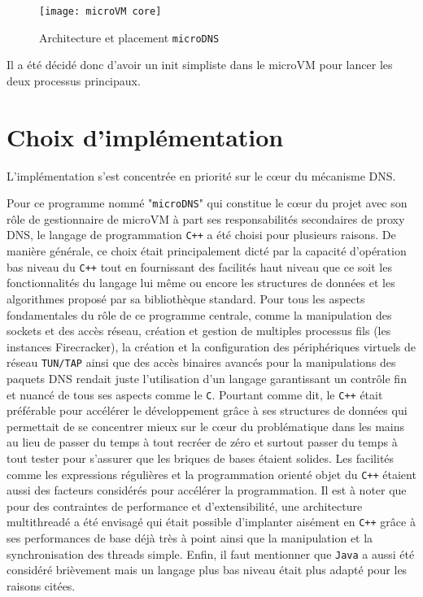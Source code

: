 \documentclass[12pt]{article}
\begin{document}
\begin{figure}[H]
	\centering
	\texttt{[image: microVM core]}
	\caption{Architecture et placement \texttt{microDNS}}
	\label{microVM:corearch}
\end{figure}

Il a été décidé donc d'avoir un init simpliste dans le microVM pour lancer les deux processus principaux.

\section{Choix d'implémentation}
\label{header:choiximpem}
L'implémentation s'est concentrée en priorité sur le cœur du mécanisme DNS.

Pour ce programme nommé "\texttt{microDNS}" qui constitue le cœur du projet avec son rôle de gestionnaire de microVM à part ses responsabilités secondaires de proxy DNS, le langage de programmation \texttt{C++} a été choisi pour plusieurs raisons. De manière générale, ce choix était principalement dicté par la capacité d'opération bas niveau du \texttt{C++} tout en fournissant des facilités haut niveau que ce soit les fonctionnalités du langage lui même ou encore les structures de données et les algorithmes proposé par sa bibliothèque standard. Pour tous les aspects fondamentales du rôle de ce programme centrale, comme la manipulation des sockets et des accès réseau, création et gestion de multiples processus fils (les instances Firecracker), la création et la configuration des périphériques virtuels de réseau \texttt{TUN/TAP} ainsi que des accès binaires avancés pour la manipulations des paquets DNS rendait juste l'utilisation d'un langage garantissant un contrôle fin et nuancé de tous ses aspects comme le \texttt{C}. Pourtant comme dit, le \texttt{C++} était préférable pour accélérer le développement grâce à ses structures de données qui permettait de se concentrer mieux sur le cœur du problématique dans les mains au lieu de passer du temps à tout recréer de zéro et surtout passer du temps à tout tester pour s'assurer que les briques de bases étaient solides. Les facilités comme les expressions régulières et la programmation orienté objet du \texttt{C++} étaient aussi des facteurs considérés pour accélérer la programmation. Il est à noter que pour des contraintes de performance et d'extensibilité, une architecture multithreadé a été envisagé qui était possible d'implanter aisément en \texttt{C++} grâce à ses performances de base déjà très à point ainsi que la manipulation et la synchronisation des threads simple. Enfin, il faut mentionner que \texttt{Java} a aussi été considéré brièvement mais un langage plus bas niveau était plus adapté pour les raisons citées.
\end{document}
